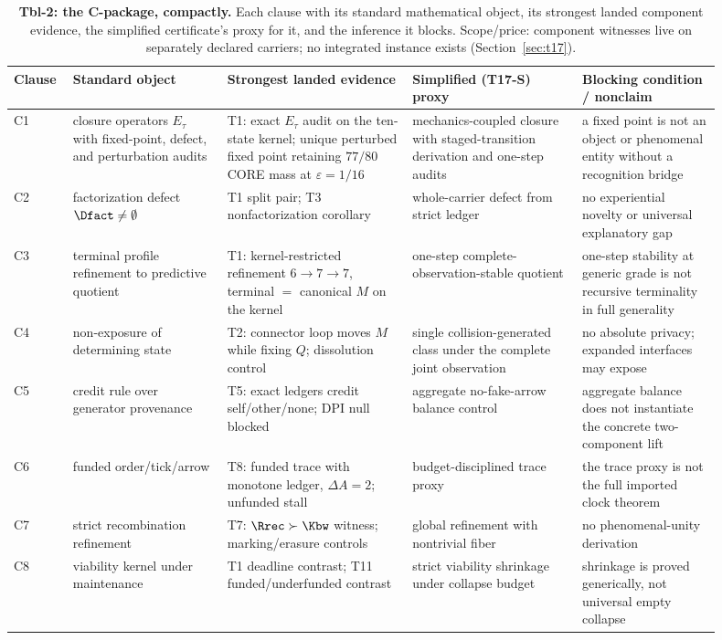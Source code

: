 \begin{table}[t]
\centering\footnotesize
\begin{tabular}{p{0.06\linewidth}p{0.2\linewidth}p{0.24\linewidth}p{0.22\linewidth}p{0.18\linewidth}}
\toprule
Clause & Standard object & Strongest landed evidence & Simplified (T17-S) proxy & Blocking condition / nonclaim \\
\midrule
C1 & closure operators $E_\tau$ with fixed-point, defect, and perturbation audits & T1: exact $E_\tau$ audit on the ten-state kernel; unique perturbed fixed point retaining $77/80$ CORE mass at $\varepsilon=1/16$ & mechanics-coupled closure with staged-transition derivation and one-step audits & a fixed point is not an object or phenomenal entity without a recognition bridge \\
C2 & factorization defect $\Dfact\neq\emptyset$ & T1 split pair; T3 nonfactorization corollary & whole-carrier defect from strict ledger & no experiential novelty or universal explanatory gap \\
C3 & terminal profile refinement to predictive quotient & T1: kernel-restricted refinement $6\to7\to7$, terminal $=$ canonical $M$ on the kernel & one-step complete-observation-stable quotient & one-step stability at generic grade is not recursive terminality in full generality \\
C4 & non-exposure of determining state & T2: connector loop moves $M$ while fixing $Q$; dissolution control & single collision-generated class under the complete joint observation & no absolute privacy; expanded interfaces may expose \\
C5 & credit rule over generator provenance & T5: exact ledgers credit self/other/none; DPI null blocked & aggregate no-fake-arrow balance control & aggregate balance does not instantiate the concrete two-component lift \\
C6 & funded order/tick/arrow & T8: funded trace with monotone ledger, $\Delta A = 2$; unfunded stall & budget-disciplined trace proxy & the trace proxy is not the full imported clock theorem \\
C7 & strict recombination refinement & T7: $\Rrec\succ\Kbw$ witness; marking/erasure controls & global refinement with nontrivial fiber & no phenomenal-unity derivation \\
C8 & viability kernel under maintenance & T1 deadline contrast; T11 funded/underfunded contrast & strict viability shrinkage under collapse budget & shrinkage is proved generically, not universal empty collapse \\
\bottomrule
\end{tabular}
\caption{\textbf{Tbl-2: the C-package, compactly.} Each clause with its
standard mathematical object, its strongest landed component evidence, the
simplified certificate's proxy for it, and the inference it blocks.
Scope/price: component witnesses live on separately declared carriers; no
integrated instance exists (Section~\ref{sec:t17}).}
\label{tbl:cpackage}
\end{table}

